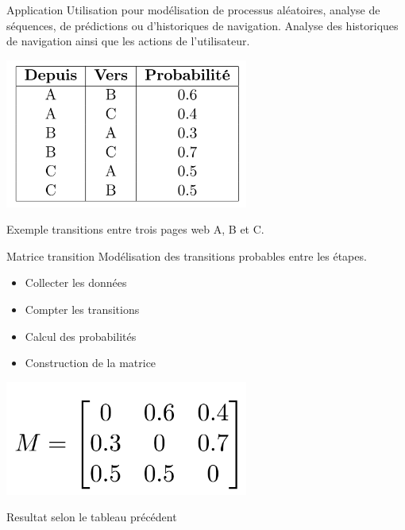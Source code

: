\begin{frame}{Application}
	\vspace*{-0.3cm}
	Utilisation pour modélisation de processus aléatoires, analyse de séquences, de prédictions ou d'historiques de navigation.  
    Analyse des historiques de navigation ainsi que les actions de l'utilisateur. 

	\begin{center}
		\includegraphics[width=0.6\textwidth]{images/tableau_proba_markov.png}
        \par
     Exemple transitions entre trois pages web A, B et C. 
	\end{center}
\end{frame}

\begin{frame}{Matrice transition}
		Modélisation des transitions probables entre les étapes.
        \begin{itemize}
            \item Collecter les données
            \item Compter les transitions
            \item Calcul des probabilités 
            \item Construction de la matrice
        \end{itemize}
	\begin{center}
		\includegraphics[width=0.6\textwidth]{images/matrice_transition.png} 
        \par
        Resultat selon le tableau précédent
	\end{center}
\end{frame}

